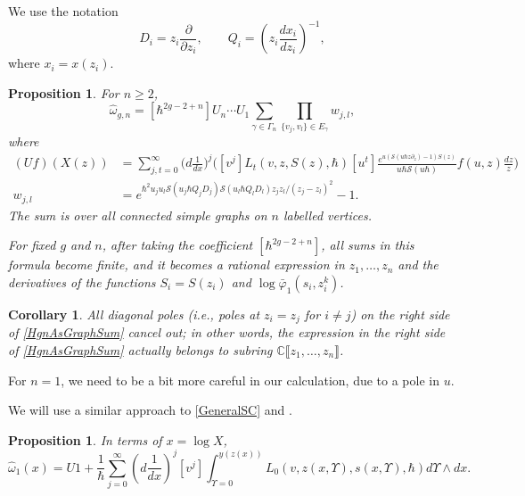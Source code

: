 \documentclass[10pt,a4paper,oneside,no-math,reqno]{amsart}%
\theoremstyle{plain}
\newtheorem{proposition}[theorem]{Proposition}
\newtheorem{corollary}[theorem]{Corollary}
\theoremstyle{definition}
\theoremstyle{remark}
\numberwithin{equation}{section}
\renewcommand{\phi}{\varphi}
\newcommand{\mb}[1]{\mathbb{#1}}
\newcommand{\mc}[1]{\mathcal{#1}}
\newcommand{\1}{\mathds{1}}
\newcommand{\C}{\mb{C}}
\newcommand{\<}{\langle}
\renewcommand{\>}{\rangle}
\newcommand{\del}{\partial}
\begin{document}
We use the notation
\begin{equation}
	D_i=z_i\frac{\partial}{\partial z_i},
	\qquad
	Q_i=\left(z_i\frac{dx_i}{dz_i}\right)^{-1},
\end{equation}
where $x_i=x(z_i)$.

\begin{proposition}
	For $ n \geq 2$,
	\begin{equation}\label{HgnAsGraphSum}
		\widehat{\omega}_{g,n}
		=
		[\hbar^{2g-2+n}] U_n \dotsb U_1 \sum_{\gamma \in \Gamma_n} \prod_{\{ v_j, v_l\} \in E_\gamma} w_{j,l} ,
	\end{equation}
	where
	\begin{align}
		(Uf) (X(z))
		&=
		\sum_{j,t = 0}^\infty \big( d \frac{1}{dx}\big)^j \Big( [v^j] L_t(v, z, S(z),\hbar) [u^t]\frac{e^{u (\mc{S}(u \hbar z \del_z) -1) S(z)}}{u \hbar \mc{S}(u\hbar)} f(u,z) \frac{dz}{z} \Big)
		\\
		w_{j,l} 
		&=
		e^{\hbar^2 u_j u_l \mc{S}(u_j \hbar Q_j D_j) \mc{S}(u_l \hbar Q_l D_l) z_j z_l/ (z_j - z_l)^2} -1 .
	\end{align}
	The sum is over all connected simple graphs on $n$ labelled vertices.\par
	For fixed $g$ and $n$, after taking the coefficient $[\hbar^{2g-2+n}]$, all sums in this formula become finite, and it becomes a rational expression in $z_1, \dotsc, z_n$ and the derivatives of the functions $S_i = S(z_i)$ and $ \log \bar{\phi}_1 (s_i, z_i^k)$.
\end{proposition}

\begin{corollary}
	All diagonal poles (i.e., poles at $z_i = z_j$ for $i \neq j$) on the right side of \cref{HgnAsGraphSum} cancel out; in other words, the expression in the right side of \cref{HgnAsGraphSum} actually belongs to subring $ \C \llbracket z_1, \dotsc, z_n \rrbracket$.
\end{corollary}


For $ n=1$, we need to be a bit more careful in our calculation, due to a pole in $u$.

We will use a similar approach to \cref{GeneralSC} and \cite[Section 6.2]{BDKS22}.

\begin{proposition}
	In terms of $ x = \log X$,
	\begin{equation}\label{FormulaForn=1}
		\widehat{\omega}_1 (x)
		=
	    U 1 + \frac{1}{\hbar}\sum_{j=0}^\infty (d \frac{1}{dx})^j [v^j] \int_{\Upsilon=0}^{y(z(x))} L_0(v, z(x,\Upsilon), s(x,\Upsilon),\hbar) d\Upsilon \wedge dx .
\end{equation}
\end{proposition}
\end{document}
